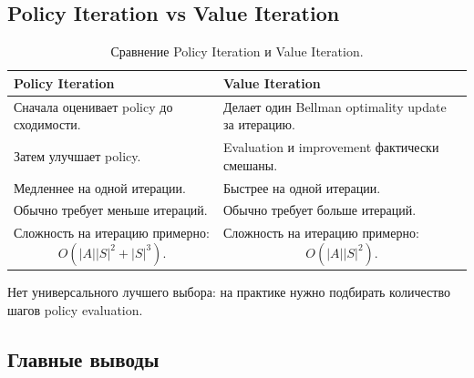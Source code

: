 \documentclass[a4paper,12pt]{article}
\begin{document}
\subsection{Policy Iteration vs Value Iteration}

\begin{table}[H]
\centering
\begin{tabular}{p{} p{}}
\toprule
\textbf{Policy Iteration} & \textbf{Value Iteration} \\
\midrule
Сначала оценивает policy до сходимости. &
Делает один Bellman optimality update за итерацию. \\

Затем улучшает policy. &
Evaluation и improvement фактически смешаны. \\

Медленнее на одной итерации. &
Быстрее на одной итерации. \\

Обычно требует меньше итераций. &
Обычно требует больше итераций. \\

Сложность на итерацию примерно:
\[
O(|A||S|^2 + |S|^3).
\]
&
Сложность на итерацию примерно:
\[
O(|A||S|^2).
\]
\\
\bottomrule
\end{tabular}
\caption{Сравнение Policy Iteration и Value Iteration.}
\end{table}

Нет универсального лучшего выбора: на практике нужно подбирать количество шагов policy evaluation.

\subsection{Главные выводы}
\end{document}
